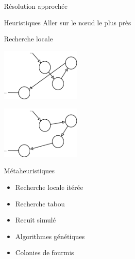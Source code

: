 \documentclass{beamer}
\begin{document}
\begin{frame}{Résolution approchée}
    \begin{block}{Heuristiques}
        Aller sur le nœud le plus près
    \end{block}

    \begin{block}{Recherche locale}
      \centering
      \begin{multicols}{2}
        \includegraphics[width=0.3\textwidth]{../rapport/graphes/2opt1.png}

        \includegraphics[width=0.3\textwidth]{../rapport/graphes/2opt2.png}
      \end{multicols}
    \end{block}
\end{frame}

\begin{frame}{Métaheuristiques}
    \begin{itemize}
        \item Recherche locale itérée
        \item Recherche tabou
        \item Recuit simulé
        \item Algorithmes génétiques
        \item Colonies de fourmis
    \end{itemize}
\end{frame}
\end{document}
